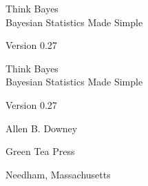 \documentclass[12pt]{book}
\newcommand{\theversion}{0.27}
\begin{document}
\begin{latexonly}

\renewcommand{\blankpage}{\thispagestyle{empty} \quad \newpage}


\thispagestyle{empty}

\begin{flushright}
\vspace*{2.0in}

\begin{spacing}{3}
{\huge Think Bayes}\\
{\Large Bayesian Statistics Made Simple}
\end{spacing}

\vspace{0.25in}

Version \theversion

\vfill

\end{flushright}


\blankpage
\blankpage

\pagebreak
\thispagestyle{empty}

\begin{flushright}
\vspace*{2.0in}

\begin{spacing}{3}
{\huge Think Bayes}\\
{\Large Bayesian Statistics Made Simple}
\end{spacing}

\vspace{0.25in}

Version \theversion

\vspace{1in}


{\Large
Allen B. Downey\\
}


\vspace{0.5in}

{\Large Green Tea Press}

{\small Needham, Massachusetts}

\vfill

\end{flushright}


\pagebreak
\thispagestyle{empty}


\end{latexonly}
\end{document}
